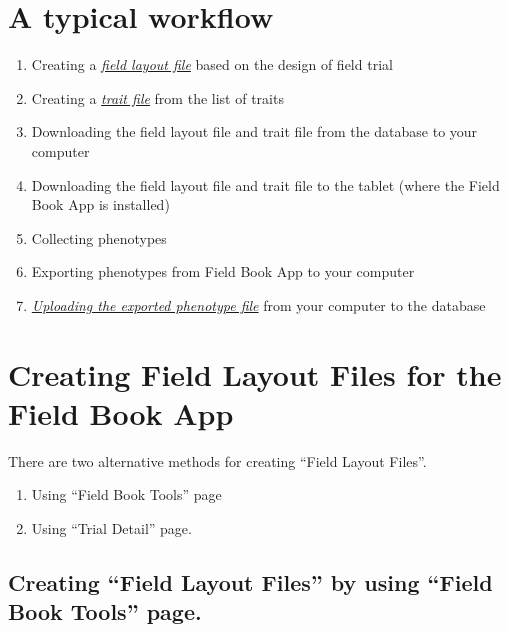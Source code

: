 \documentclass[
  12pt,
]{book}
\begin{document}
\hypertarget{a-typical-workflow}{%
\section{A typical workflow}\label{a-typical-workflow}}

\begin{enumerate}
\def\labelenumi{\arabic{enumi}.}
\item
  Creating a \protect\hyperlink{creating-layout-files}{\emph{field layout file}} based on the design of field trial
\item
  Creating a \protect\hyperlink{creating-trait-files}{\emph{trait file}} from the list of traits
\item
  Downloading the field layout file and trait file from the database to your computer
\item
  Downloading the field layout file and trait file to the tablet (where the Field Book App is installed)
\item
  Collecting phenotypes
\item
  Exporting phenotypes from Field Book App to your computer
\item
  \protect\hyperlink{uploading-pheno-files}{\emph{Uploading the exported phenotype file}} from your computer to the database
\end{enumerate}

\hypertarget{creating-layout-files}{%
\section{Creating Field Layout Files for the Field Book App}\label{creating-layout-files}}

There are two alternative methods for creating ``Field Layout Files''.

\begin{enumerate}
\def\labelenumi{\arabic{enumi}.}
\item
  Using ``Field Book Tools'' page
\item
  Using ``Trial Detail'' page.
\end{enumerate}

\hypertarget{creating-field-layout-files-by-using-field-book-tools-page.}{%
\subsection{Creating ``Field Layout Files'' by using ``Field Book Tools'' page.}\label{creating-field-layout-files-by-using-field-book-tools-page.}}
\end{document}
